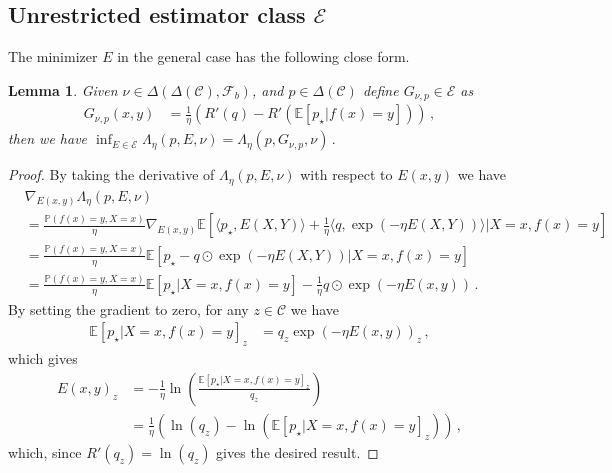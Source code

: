 \documentclass{article}
\theoremstyle{plain}
\newtheorem{lemma}[theorem]{Lemma}
\theoremstyle{definition}
\theoremstyle{remark}
\newcommand{\E}{\mathbb E}
\newcommand{\PP}{\mathbb P}
\newcommand{\cE}{\mathcal E}
\newcommand{\cF}{\mathcal F}
\newcommand{\cC}{\mathcal C}
\theoremstyle{definition}
\begin{document}
\subsection{Unrestricted estimator class $\cE$}
The minimizer $E$ in the general case has the following close form.
\begin{lemma}
    Given $\nu \in \Delta(\Delta(\cC), \cF_b)$, and $p \in \Delta(\cC)$
    define $G_{\nu, p} \in \cE$ as
    \begin{align*}
        G_{\nu, p}(x, y) & =
        \frac{1}{\eta}\left(
        R'(q) - R'(\E[p_\star|f(x) = y])
        \right)\,,
    \end{align*}
    then we have
    $
        \inf_{E \in \cE}
        \Lambda_\eta(p, E, \nu)
        =
        \Lambda_\eta(p, G_{\nu, p}, \nu)\,.
    $
\end{lemma}
\begin{proof}
    By taking the derivative of $\Lambda_\eta(p, E, \nu)$ with respect to $E(x,y)$ we have
    \begin{align*}
         & \nabla_{E(x,y)}
        \Lambda_\eta(p, E, \nu)
        \\
         & =
        \tfrac{\PP(f(x)=y,X=x)}{\eta}
        \nabla_{E(x,y)}
        \E\!\left[
            \langle p_\star, E(X, Y) \rangle
            + \tfrac{1}{\eta}
            \langle q, \exp(- \eta E(X, Y))\rangle
            |
            X = x, f(x) = y
            \right]
        \\
         & =
        \tfrac{\PP(f(x)=y,X=x)}{\eta}
        \E\!\left[
            p_\star
            -
            q \odot \exp(- \eta E(X, Y))
            |
            X = x, f(x) = y
            \right]
        \\
         & =
        \tfrac{\PP(f(x)=y,X=x)}{\eta}
        \E\!\left[
            p_\star
            |
            X = x, f(x) = y
            \right]
        -
        \tfrac{1}{\eta}
        q \odot \exp(- \eta E(x, y))\,.
    \end{align*}
    By setting the gradient to zero, for any $z \in \cC$ we have
    \begin{align*}
        \E\!\left[
            p_\star
            |
            X = x, f(x) = y
            \right]_z
         & =
        q_z \exp(- \eta E(x, y))_z\,,
    \end{align*}
    which gives
    \begin{align*}
        E(x, y)_z
         & =
        -\frac{1}{\eta} \ln\left(
        \frac{\E\!\left[p_\star|X = x, f(x) = y\right]_z}{q_z}
        \right)
        \\
         & =
        \frac{1}{\eta}\left(
        \ln(q_z)-
        \ln\left(
            \E\!\left[p_\star|X = x, f(x) = y\right]_z
            \right)
        \right)\,,
    \end{align*}
    which, since $R'(q_z) = \ln(q_z)$ gives the desired result.
\end{proof}
\end{document}
